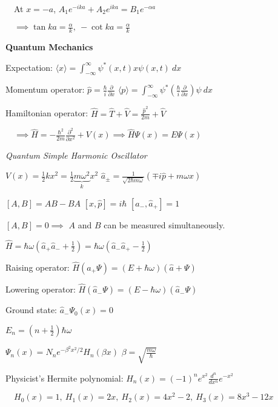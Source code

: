 \documentclass[twocolumn]{article}
\begin{document}
$\quad$At $x=-a$, $A_1 e^{-ika} + A_2 e^{ika} = B_1 e^{-\alpha a}$

$\quad \implies \tan ka = \frac{\alpha}{k},\ -\cot ka = \frac{\alpha}{k}$

\dotfill

\textbf{Quantum Mechanics}

Expectation: $\langle x \rangle = \int_{-\infty}^\infty \psi^*(x, t) x \psi(x, t)\ dx$

Momentum operator: $\hat{p} = \frac{\hbar}{i} \frac{\partial}{\partial x}$ \hfill $\langle p \rangle = \int_{-\infty}^\infty \psi^* \left( \frac{\hbar}{i} \frac{\partial}{\partial x} \right) \psi\ dx$

Hamiltonian operator: $\hat{H} = \hat{T} + \hat{V} = \frac{\hat{p}^2}{2m} + \hat{V}$

$\quad \implies \hat{H} = -\frac{\hbar^2}{2m} \frac{\partial^2}{\partial x^2} + V(x) \implies \hat{H} \Psi(x) = E \Psi(x)$

\dotfill

\textit{Quantum Simple Harmonic Oscillator}

$V(x) = \frac{1}{2} kx^2 = \frac{1}{2} \underbrace{m \omega^2}_{k} x^2$ \hfill $\hat{a}_\pm = \frac{1}{\sqrt{2\hbar m \omega}} (\mp i\hat{p} + m\omega x)$

$[A, B] = AB - BA$ \hfill $[x, \hat{p}] = i \hbar$ \hfill $[\hat{a}_{-}, \hat{a}_+] = 1$


\cleardoublepage

$[A, B] = 0 \implies$ $A$ and $B$ can be measured simultaneously.

$\hat{H} = \hbar \omega \left(\hat{a}_+ \hat{a}_{-} + \frac{1}{2} \right) = \hbar \omega \left(\hat{a}_{-} \hat{a}_{+} - \frac{1}{2} \right)$

Raising operator: $\hat{H} (\hat{a}_+ \Psi) = (E + \hbar \omega) (\hat{a} + \Psi)$

Lowering operator: $\hat{H} (\hat{a}_{-} \Psi) = (E - \hbar \omega) (\hat{a}_{-} \Psi)$

Ground state: $\hat{a}_{-} \Psi_0(x) = 0$

$E_n = \left(n + \frac{1}{2} \right) \hbar \omega$

$\Psi_n(x) = N_n e^{-\beta^2x^2/2} H_n(\beta x)$ \hfill $\beta = \sqrt{\frac{m\omega}{\hbar}}$

Physicist's Hermite polynomial: $H_n(x) = (-1)^n e^{x^2} \frac{d^n}{dx^n} e^{-x^2}$

$\quad H_0(x) = 1,\ H_1(x) = 2x,\ H_2(x) = 4x^2 - 2,\ H_3(x) = 8x^3-12x$
\end{document}
